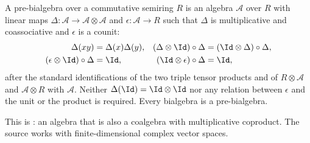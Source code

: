 \begin{definition}
    \label{def:mpoalg_pre_bialgebra}
    \leanok
    A pre-bialgebra over a commutative semiring $R$ is an algebra
    $\mathcal A$ over $R$ with linear maps
    $\Delta\colon\mathcal A\to\mathcal A\otimes\mathcal A$ and
    $\epsilon\colon\mathcal A\to R$ such that $\Delta$ is multiplicative and
    coassociative and $\epsilon$ is a counit:
    \begin{align}
        \Delta(xy)                    & =\Delta(x)\Delta(y),            &
        (\Delta\otimes\Id)\circ\Delta & =(\Id\otimes\Delta)\circ\Delta,
        \label{eq:mpoalg_pre_bialgebra}                                   \\
        (\epsilon\otimes\Id)\circ\Delta
                                      & =\Id,                           &
        (\Id\otimes\epsilon)\circ\Delta
                                      & =\Id,
        \label{eq:mpoalg_pre_bialgebra_counit}
    \end{align}
    after the standard identifications of the two triple tensor products and
    of $R\otimes\mathcal A$ and $\mathcal A\otimes R$ with $\mathcal A$.
    Neither $\Delta(\Id)=\Id\otimes\Id$ nor any relation between $\epsilon$
    and the unit or the product is required. Every bialgebra is a
    pre-bialgebra.

    This is \cite[Definition~4.1]{Molnar2022MPOAlgebrasI}: an algebra that is
    also a coalgebra \cite[Definition~3.1]{Molnar2022MPOAlgebrasI} with
    multiplicative coproduct. The source works with finite-dimensional
    complex vector spaces.
\end{definition}

